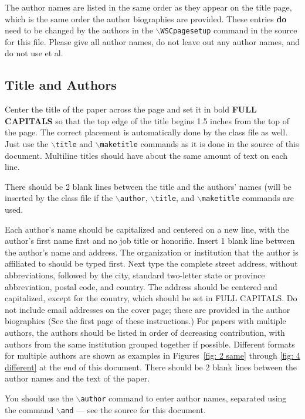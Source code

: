 \documentclass{wscpaperproc}
\theoremstyle{wsc}
\begin{document}
The author names are listed in the same order as they appear on the title page, which is the same order the author biographies are provided.
These entries {\bf do} need to be changed by the authors in the {\tt $\backslash$WSCpagesetup} command in the source for this file.
Please give all author names, do not leave out any author names, and do not use et al.


\subsection{Title and Authors}
Center the title of the paper across the page and set it in bold {\bf FULL CAPITALS} so that the top edge of the title begins 1.5 inches from the top of the page.
The correct placement is automatically done by the class file as well.
Just use the {\tt $\backslash$title} and {\tt $\backslash$maketitle} commands as it is done in the source of this document.
Multiline titles should have about the same amount of text on each line.

There should be 2 blank lines between the title and the authors' names (will be inserted by the class file if the {\tt $\backslash$author}, {\tt $\backslash$title}, and {\tt $\backslash$maketitle} commands are used.

Each author's name should be capitalized and centered on a new line, with the author's first name first and no job title or honorific.
Insert 1 blank line between the author's name and address. The organization or institution that the author is affiliated to should be typed first.
Next type the complete street address, without abbreviations, followed by the city, standard two-letter state or province abbreviation, postal code, and country.
The address should be centered and capitalized, except for the country, which should be set in FULL CAPITALS. Do not include email addresses on the cover page; these are provided in the author biographies (See the first page of these instructions.)
For papers with multiple authors, the authors should be listed in order of decreasing contribution, with authors from the same institution grouped together if possible.
Different formats for multiple authors are shown as examples in Figures~\ref{fig: 2 same} through \ref{fig: 4 different} at the end of this document.
There should be 2 blank lines between the author names and the text of the paper.

You should use the {\tt $\backslash$author} command to enter author names, separated using the command {\tt $\backslash$and} --- see the source for this document.
\end{document}
